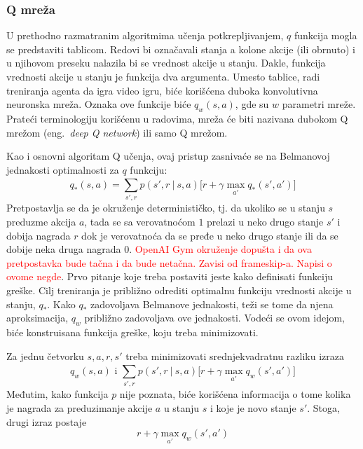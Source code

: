 \subsubsection{Q mreža}

U prethodno razmatranim algoritmima učenja potkrepljivanjem, $q$ funkcija mogla se predstaviti tablicom. Redovi bi označavali stanja a kolone akcije (ili obrnuto) i u njihovom preseku nalazila bi se vrednost akcije u stanju. Dakle, funkcija vrednosti akcije u stanju je funkcija dva argumenta. Umesto tablice, radi treniranja agenta da igra video igru, biće korišćena duboka konvolutivna neuronska mreža. Oznaka ove funkcije biće $q_w(s,a)$, gde su $w$ parametri mreže. Prateći terminologiju korišćenu u radovima, mreža će biti nazivana dubokom Q mrežom (eng.~{\em deep Q network}) ili samo Q mrežom.
\par 
Kao i osnovni algoritam Q učenja, ovaj pristup zasnivaće se na Belmanovoj jednakosti optimalnosti za $q$ funkciju:
\begin{equation}
	q_*(s,a) = \sum_{s', r}^{} p(s', r~|~s,a)\big[r + \gamma \max_{a'}q_*(s',a')\big]
\end{equation}
Pretpostavlja se da je okruženje determinističko, tj. da ukoliko se u stanju $s$ preduzme akcija $a$, tada se sa verovatnoćom $1$ prelazi u neko drugo stanje $s'$  i dobija nagrada $r$ dok je verovatnoća da se pređe u neko drugo stanje ili da se dobije neka druga nagrada $0$. \textcolor{red}{OpenAI Gym okruženje dopušta i da ova pretpostavka bude tačna i da bude netačna. Zavisi od frameskip-a. Napisi o ovome negde}. Prvo pitanje koje treba postaviti jeste kako definisati funkciju greške. Cilj treniranja je približno odrediti optimalnu funkciju vrednosti akcije u stanju, $q_*$. Kako $q_*$ zadovoljava Belmanove jednakosti, teži se tome da njena aproksimacija, $q_w$ približno zadovoljava ove jednakosti. Vodeći se ovom idejom, biće konstruisana funkcija greške, koju treba minimizovati. 
\par 
Za jednu četvorku $s, a, r, s'$ treba minimizovati srednjekvadratnu razliku izraza
\begin{equation}
	q_w(s,a) \text{~i~} \sum_{s', r}^{} p(s', r~|~s,a)\big[r + \gamma \max_{a'}q_w(s',a')\big]
\end{equation}
Međutim, kako funkcija $p$ nije poznata, biće korišćena informacija o tome kolika je nagrada za preduzimanje akcije $a$ u stanju $s$ i koje je novo stanje $s'$. Stoga, drugi izraz postaje
\begin{equation}
	r + \gamma \max_{a'}q_w(s',a')
\end{equation}
